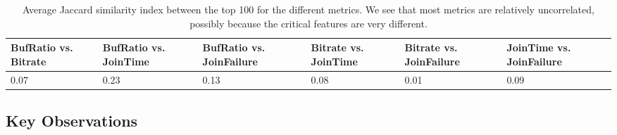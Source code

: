  



\begin{table}[t]
\begin{center}
\begin{small}
\begin{tabular}{p{2cm}|p{2cm}|p{2cm}|p{2cm}|p{2cm}|p{2cm}}
	BufRatio vs. Bitrate & BufRatio vs. JoinTime & BufRatio vs. JoinFailure & Bitrate vs. JoinTime & Bitrate vs. JoinFailure & JoinTime vs. JoinFailure\\ \hline 
0.07 & 0.23 & 0.13 & 0.08 & 0.01 & 0.09 \\
\end{tabular}
\end{small}
\end{center}
\caption{Average Jaccard similarity index between the top 
100 \criticalclusters for the different metrics. 
 We see that most metrics are relatively uncorrelated, possibly because the 
 critical features are very different.}
\end{table}


\subsection{Key Observations}
\label{subsec:measurement:video:discuss}

